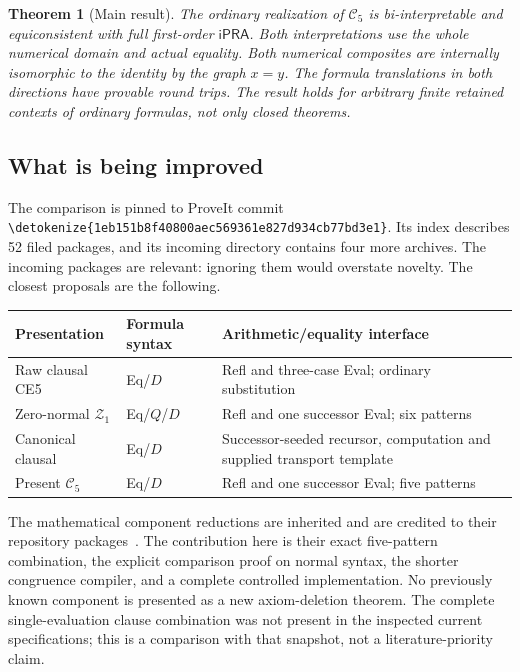 \documentclass[11pt]{article}
\newtheorem{theorem}{Theorem}[section]
\theoremstyle{definition}
\newcommand{\ipra}{\mathsf{iPRA}}
\newcommand{\C}{\mathcal C_5}
\newcommand{\file}[1]{\expandafter\nolinkurl\expandafter{\detokenize{#1}}}
\begin{document}
\begin{theorem}[Main result]\label{thm:main}
The ordinary realization of $\C$ is bi-interpretable and equiconsistent
with full first-order $\ipra$. Both interpretations use the whole numerical
domain and actual equality. Both numerical composites are internally
isomorphic to the identity by the graph $x=y$. The formula translations in
both directions have provable round trips. The result holds for arbitrary
finite retained contexts of ordinary formulas, not only closed theorems.
\end{theorem}

\subsection{What is being improved}

The comparison is pinned to ProveIt commit
\file{1eb151b8f40800aec569361e827d934cb77bd3e1}. Its index describes
52 filed packages, and its incoming directory contains four more archives.
The incoming packages are relevant: ignoring them would overstate novelty.
The closest proposals are the following.

\begin{center}
\begin{tabular}{@{}p{.25\linewidth}p{.19\linewidth}p{.44\linewidth}@{}}
\toprule
Presentation & Formula syntax & Arithmetic/equality interface\\
\midrule
Raw clausal CE5 & Eq/$D$ & Refl and three-case Eval; ordinary substitution\\
Zero-normal $\mathcal Z_1$ & Eq/$Q$/$D$ & Refl and one successor Eval; six patterns\\
Canonical clausal & Eq/$D$ & Successor-seeded recursor, computation and supplied transport template\\
Present $\C$ & Eq/$D$ & Refl and one successor Eval; five patterns\\
\bottomrule
\end{tabular}
\end{center}

The mathematical component reductions are inherited and are credited to
their repository packages~\cite{rawclausal,iteration,clausal,baseline}.
The contribution here is their exact five-pattern combination, the explicit
comparison proof on normal syntax, the shorter congruence compiler, and a
complete controlled implementation. No previously known component is
presented as a new axiom-deletion theorem. The complete single-evaluation
clause combination was not present in the inspected current specifications;
this is a comparison with that snapshot, not a literature-priority claim.
\end{document}
